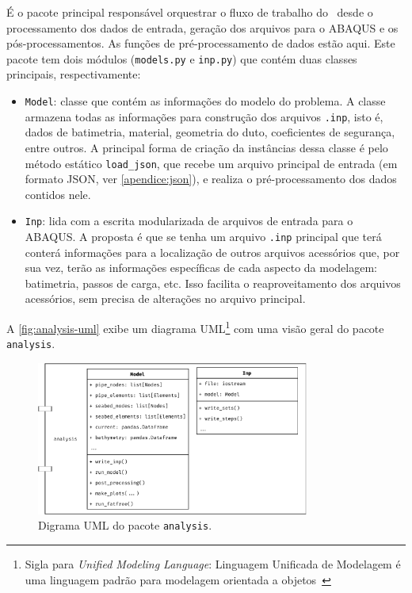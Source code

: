 É o pacote principal responsável orquestrar o fluxo de trabalho do \frame\ desde o processamento dos dados de entrada, geração dos arquivos para o ABAQUS e os pós-processamentos. As funções de pré-processamento de dados estão aqui. Este pacote tem dois módulos (\texttt{models.py} e \texttt{inp.py}) que contém duas classes principais, respectivamente:

\begin{itemize}
    \item \texttt{Model}: classe que contém as informações do modelo do problema.
    A classe armazena todas as informações para construção dos arquivos \texttt{.inp}, isto é, dados de batimetria, material, geometria do duto, coeficientes de segurança, entre outros.
    A principal forma de criação da instâncias dessa classe é pelo método estático \texttt{load\_json}, que recebe um arquivo principal de entrada (em formato JSON, ver \autoref{apendice:json}), e realiza o pré-processamento dos dados contidos nele.

    \item \texttt{Inp}: lida com a escrita modularizada de arquivos de entrada  para o ABAQUS. A proposta é que se tenha um arquivo \texttt{.inp} principal que terá conterá informações para a localização de outros arquivos acessórios que, por sua vez, terão as informações específicas de cada aspecto da modelagem: batimetria, passos de carga, etc. Isso facilita o reaproveitamento dos arquivos acessórios, sem precisa de alterações no arquivo principal.
\end{itemize}

A \autoref{fig:analysis-uml} exibe um diagrama UML\footnote{Sigla para \textit{Unified Modeling Language}: Linguagem Unificada de Modelagem é uma linguagem padrão para modelagem orientada a objetos~\cite{infoescolauml}} com uma visão geral do pacote \texttt{analysis}.

\begin{figure}[!ht]
    \centering
    \caption{Digrama UML do pacote \texttt{analysis}.}\label{fig:analysis-uml}
    \includegraphics[width=0.8\textwidth]{imagens/analysis-uml}
\end{figure}


